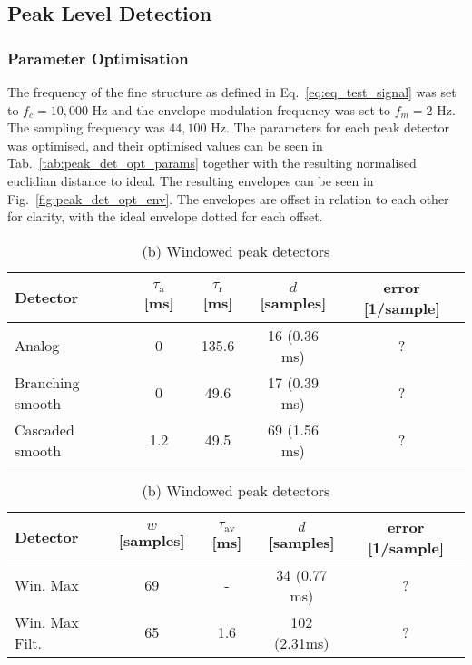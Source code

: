 \documentclass[../main2.tex]{subfiles}
\begin{document}
\subsection{Peak Level Detection}

\subsubsection{Parameter Optimisation}
The frequency of the fine structure as defined in Eq.~\eqref{eq:eq_test_signal} was set to $f_c = 10,000$ Hz and the envelope modulation frequency was set to $f_m = 2$ Hz. The sampling frequency was $44,100$ Hz. The parameters for each peak detector was optimised, and their optimised values can be seen in Tab.~\ref{tab:peak_det_opt_params} together with the resulting normalised euclidian distance to ideal. The resulting envelopes can be seen in Fig.~\ref{fig:peak_det_opt_env}. The envelopes are offset in relation to each other for clarity, with the ideal envelope dotted for each offset. 

\begin{table}[h]
\begin{center}
\caption{Optimised parameters for the various peak detectors, $f_c=1000/\pi $, $f_m=2 $}
\label{tab:peak_det_opt_params}
\caption*{(a) Attack and release peak detectors}
\begin{tabular}{| l | c c c | c |}
	\hline
	Detector 	& $\tau_\text{a}$ [ms] & $\tau_\text{r}$ [ms] & $d$ [samples] & error [1/sample]\\
	\hline
	
	Analog 			& 0 			& 135.6 	& 16	(0.36 ms)	& ?	\\ 
	Branching smooth 	& 0	 		& 49.6 	& 17	(0.39 ms)	& ?	\\ 
	Cascaded smooth	& 1.2		& 49.5 	& 69	(1.56 ms)	& ?	\\
	\hline
\end{tabular}
\end{center}

\begin{center}
\caption*{(b) Windowed peak detectors}
\label{tab:peak_det_instatt_opt_params}
 \begin{tabular}{| l | c c c | c |}
	\hline
	Detector & $w$ [samples] & $\tau_\text{av}$ [ms] & $d$ [samples] & error [1/sample] \\
	\hline
	Win. Max		& 69		& -		& 34	(0.77 ms)	& ?	\\ 
	Win. Max Filt.	& 65		& 1.6	& 102 (2.31ms)	& ?	\\
	\hline
\end{tabular}
\end{center}

\end{table}
\end{document}
